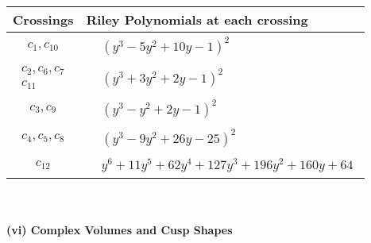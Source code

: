 \documentclass[1p]{elsarticle_modified}
\theoremstyle{definition}
\begin{document}
\begin{tabular}{m{50pt}|m{274pt}}
Crossings & \hspace{64pt}Riley Polynomials at each crossing \\
\hline $$\begin{aligned}c_{1},c_{10}\end{aligned}$$&$\begin{aligned}
&(y^3-5 y^2+10 y-1)^2
\end{aligned}$\\
\hline $$\begin{aligned}c_{2},c_{6},c_{7}\\c_{11}\end{aligned}$$&$\begin{aligned}
&(y^3+3 y^2+2 y-1)^2
\end{aligned}$\\
\hline $$\begin{aligned}c_{3},c_{9}\end{aligned}$$&$\begin{aligned}
&(y^3- y^2+2 y-1)^2
\end{aligned}$\\
\hline $$\begin{aligned}c_{4},c_{5},c_{8}\end{aligned}$$&$\begin{aligned}
&(y^3-9 y^2+26 y-25)^2
\end{aligned}$\\
\hline $$\begin{aligned}c_{12}\end{aligned}$$&$\begin{aligned}
&y^6+11 y^5+62 y^4+127 y^3+196 y^2+160 y+64
\end{aligned}$\\
\hline
\end{tabular}\\~\\
\newpage\flushleft \textbf{(vi) Complex Volumes and Cusp Shapes}
\end{document}

